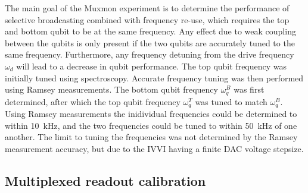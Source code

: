         The main goal of the Muxmon experiment is to determine the performance of selective broadcasting combined with frequency re-use, which requires the top and bottom qubit to be at the same frequency. Any effect due to weak coupling between the qubits is only present if the two qubits are accurately tuned to the same frequency. Furthermore, any frequency detuning from the drive frequency $\omega_d$ will lead to a decrease in qubit performance. The top qubit frequency was initially tuned using spectroscopy. Accurate frequency tuning was then performed using Ramsey measurements. The bottom qubit frequency $\omega_q^B$ was first determined, after which the top qubit frequency $\omega_q^T$  was tuned to match $\omega_q^B$. Using Ramsey measurements the inidividual frequencies could be determined to within \SI{10}{\kilo \hertz}, and the two frequencies could be tuned to within \SI{50}{\kilo \hertz} of one another. The limit to tuning the frequencies was not determined by the Ramsey measurement accuracy, but due to the IVVI having a finite DAC voltage stepsize.

      \subsection{Multiplexed readout calibration}
        \label{ssec:multiplexed readout}

